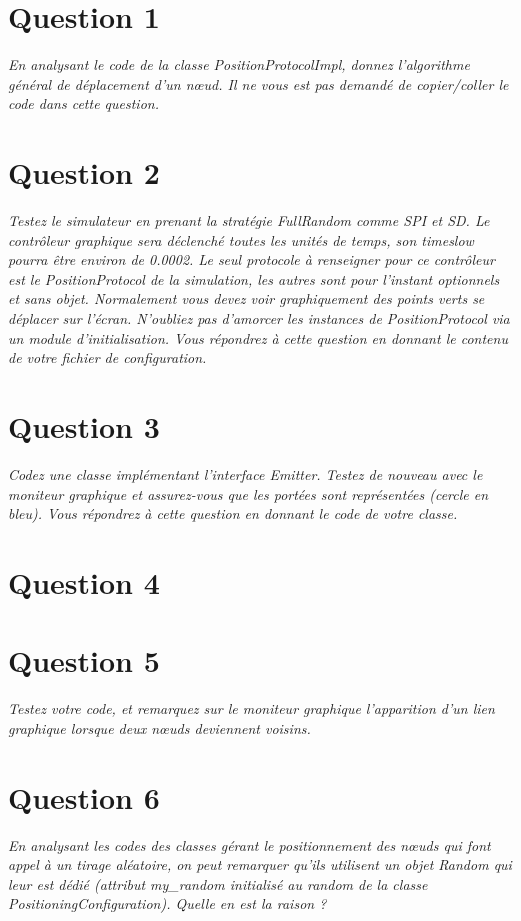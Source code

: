 \documentclass[11pt,a4paper,sans]{report}
\begin{document}
\section{Question 1}
\textit{En analysant le code de la classe PositionProtocolImpl, donnez l’algorithme général de déplacement d’un nœud. Il ne vous est pas demandé de copier/coller le code dans cette question.}




\section{Question 2}
\textit{Testez le simulateur en prenant la stratégie FullRandom comme SPI et SD. Le contrôleur graphique sera déclenché toutes les unités de temps, son timeslow pourra être environ de 0.0002. Le seul protocole à renseigner pour ce contrôleur est le PositionProtocol de la simulation, les autres sont pour l’instant optionnels et sans objet.  Normalement vous devez voir graphiquement des points verts se déplacer sur l’écran.  N’oubliez pas d’amorcer les instances de PositionProtocol via un module d’initialisation. Vous répondrez à cette question en donnant le contenu de votre fichier de configuration.}

\section{Question 3}
\textit{Codez une classe implémentant l’interface Emitter. Testez de nouveau avec le moniteur graphique et assurez-vous que les portées sont représentées (cercle en bleu).  Vous répondrez à cette question en donnant le code de votre classe.}

\section{Question 4}

\section{Question 5}
\textit{Testez votre code, et remarquez sur le moniteur graphique l’apparition d’un lien graphique lorsque deux nœuds deviennent voisins.} %

\section{Question 6}
\textit{En analysant les codes des classes gérant le positionnement des nœuds qui font appel à un tirage aléatoire, on peut remarquer qu’ils utilisent un objet Random qui leur est dédié (attribut my\_random initialisé au random de la classe PositioningConfiguration).  Quelle en est la raison ?}
\end{document}

